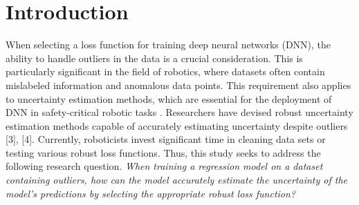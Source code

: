\documentclass[letterpaper, 10 pt, conference]{ieeeconf}  %
\begin{document}
\section{Introduction}
\noindent %
When selecting a loss function for training deep neural networks (DNN), the ability to handle outliers in the data is a crucial consideration. This is particularly significant in the field of robotics, where datasets often contain mislabeled information and anomalous data points.
This requirement also applies to uncertainty estimation methods, which are essential for the deployment of DNN in safety-critical robotic tasks \cite{borg_safely_2019, schwalbe_survey_2020}.
Researchers have devised robust uncertainty estimation methods capable of accurately estimating uncertainty despite outliers [3], [4]. Currently, roboticists invest significant time in cleaning data sets or testing various robust loss functions. Thus, this study seeks to address the following research question.
\textit{When training a regression model on a dataset containing outliers, how can the model accurately estimate the uncertainty of the model's predictions by selecting the appropriate robust loss function?}
\end{document}
